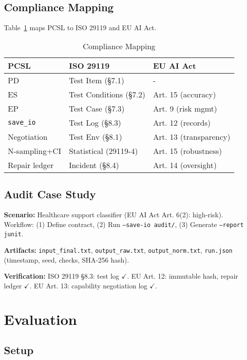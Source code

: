 \documentclass[sigconf]{acmart}
\begin{document}
\subsection{Compliance Mapping}

Table~\ref{tab:compliance} maps PCSL to ISO 29119 and EU AI Act.

\begin{table}[t]
\centering
\caption{Compliance Mapping}
\label{tab:compliance}
\scriptsize
\begin{tabular}{@{}p{2cm}p{2cm}p{2.3cm}@{}}
\toprule
\textbf{PCSL} & \textbf{ISO 29119} & \textbf{EU AI Act} \\
\midrule
PD & Test Item (§7.1) & - \\
ES & Test Conditions (§7.2) & Art. 15 (accuracy) \\
EP & Test Case (§7.3) & Art. 9 (risk mgmt) \\
\texttt{save\_io} & Test Log (§8.3) & Art. 12 (records) \\
Negotiation & Test Env (§8.1) & Art. 13 (transparency) \\
N-sampling+CI & Statistical (29119-4) & Art. 15 (robustness) \\
Repair ledger & Incident (§8.4) & Art. 14 (oversight) \\
\bottomrule
\end{tabular}
\end{table}

\subsection{Audit Case Study}

\textbf{Scenario:} Healthcare support classifier (EU AI Act Art. 6(2): high-risk). Workflow: (1) Define contract, (2) Run \texttt{--save-io audit/}, (3) Generate \texttt{--report junit}.

\textbf{Artifacts:} \texttt{input\_final.txt}, \texttt{output\_raw.txt}, \texttt{output\_norm.txt}, \texttt{run.json} (timestamp, seed, checks, SHA-256 hash).

\textbf{Verification:} ISO 29119 §8.3: test log \(\checkmark\). EU Art. 12: immutable hash, repair ledger \(\checkmark\). EU Art. 13: capability negotiation log \(\checkmark\).

\section{Evaluation}

\subsection{Setup}
\end{document}
